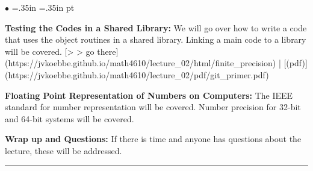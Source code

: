 \documentclass[10pt,fleqn]{article}
\begin{document}
\begin{list}{$\bullet$}{ \parsep=0pt \listparindent=0pt
\topsep=0pt \rightmargin=.35in \leftmargin=.35in  pt
\itemsep=2pt}
  \item {\bf Testing the Codes in a Shared Library:} We will go over how to
     write a code that uses the object routines in a shared library. Linking a
     main code to a library will be covered.
       [> > go there](https://jvkoebbe.github.io/math4610/lecture_02/html/finite_precision)
       | [(pdf)](https://jvkoebbe.github.io/math4610/lecture_02/pdf/git_primer.pdf)

  \item {\bf Floating Point Representation of Numbers on Computers:} The IEEE
     standard for number representation will be covered. Number precision for
     32-bit and 64-bit systems will be covered. 

  \item {\bf Wrap up and Questions:} If there is time and anyone has questions
        about the lecture, these will be addressed.

\end{list}
\vskip0.1in\hrule\vskip0.1in
\end{document}
